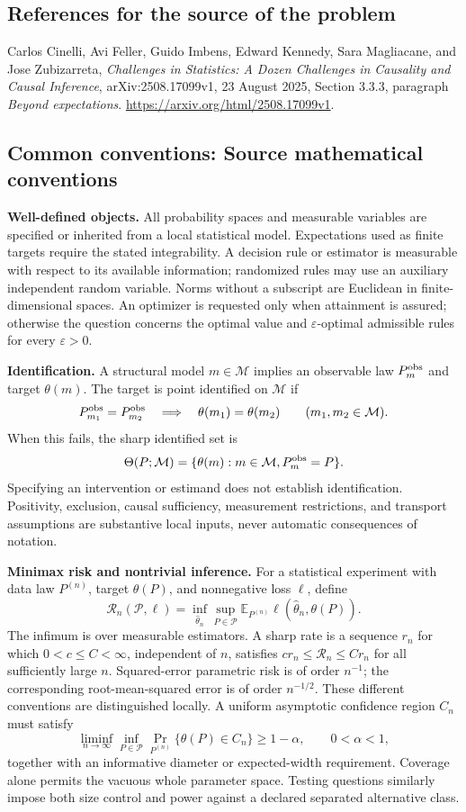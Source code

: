 \documentclass[11pt,a4paper]{article}
\newcommand{\E}{\mathbb E}
\begin{document}
\subsection*{References for the source of the problem}
Carlos Cinelli, Avi Feller, Guido Imbens, Edward Kennedy, Sara Magliacane, and Jose Zubizarreta, \emph{Challenges in Statistics: A Dozen Challenges in Causality and Causal Inference}, arXiv:2508.17099v1, 23 August 2025, Section 3.3.3, paragraph \emph{Beyond expectations}. \url{https://arxiv.org/html/2508.17099v1}.

\subsection*{Common conventions: Source mathematical conventions}

\textbf{Well-defined objects.}
All probability spaces and measurable variables are specified or inherited
from a local statistical model. Expectations used as finite targets require
the stated integrability. A decision rule or estimator is measurable with
respect to its available information; randomized rules may use an auxiliary
independent random variable. Norms without a subscript are Euclidean in
finite-dimensional spaces. An optimizer is requested only when attainment
is assured; otherwise the question concerns the optimal value and
$\varepsilon$-optimal admissible rules for every $\varepsilon>0$.

\textbf{Identification.}
A structural model $m\in\mathcal M$ implies an observable law
$P_m^{\rm obs}$ and target $\theta(m)$. The target is point identified on
$\mathcal M$ if
\[
 P_{m_1}^{\rm obs}=P_{m_2}^{\rm obs}
 \quad\Longrightarrow\quad\theta(m_1)=\theta(m_2)
 \qquad(m_1,m_2\in\mathcal M).
\]
When this fails, the sharp identified set is
\[
 \Theta(P;\mathcal M)=\{\theta(m):m\in\mathcal M,
                                  P_m^{\rm obs}=P\}.
\]
Specifying an intervention or estimand does not establish identification.
Positivity, exclusion, causal sufficiency, measurement restrictions, and
transport assumptions are substantive local inputs, never automatic
consequences of notation.

\textbf{Minimax risk and nontrivial inference.}
For a statistical experiment with data law $P^{(n)}$, target $\theta(P)$,
and nonnegative loss $\ell$, define
\[
 \mathcal R_n(\mathcal P,\ell)
   =\inf_{\widehat\theta_n}\sup_{P\in\mathcal P}
      \E_{P^{(n)}}\ell(\widehat\theta_n,\theta(P)).
\]
The infimum is over measurable estimators. A sharp rate is a sequence
$r_n$ for which $0<c\leq C<\infty$, independent of $n$, satisfies
$c r_n\leq\mathcal R_n\leq C r_n$ for all sufficiently large $n$.
Squared-error parametric risk is of order $n^{-1}$; the corresponding
root-mean-squared error is of order $n^{-1/2}$. These different conventions
are distinguished locally. A uniform asymptotic confidence region $C_n$
must satisfy
\[
 \liminf_{n\to\infty}\inf_{P\in\mathcal P}
     \Pr_{P^{(n)}}\{\theta(P)\in C_n\}\geq 1-\alpha,
 \qquad 0<\alpha<1,
\]
together with an informative diameter or expected-width requirement.
Coverage alone permits the vacuous whole parameter space. Testing questions
similarly impose both size control and power against a declared separated
alternative class.
\end{document}
